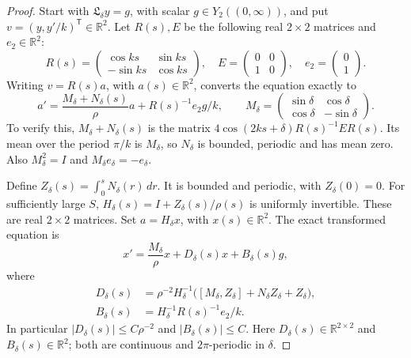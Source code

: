 \documentclass[11pt,a4paper]{article}
\newcommand{\R}{\mathbb R}
\begin{document}
\begin{proof}
Start with $\mathfrak L_\delta y=g$, with scalar
$g\in Y_2((0,\infty))$, and put $v=(y,y'/k)^{\mathsf T}\in\R^2$.
Let $R(s),E$ be the following real $2\times2$ matrices and $e_2\in\R^2$:
\[
 R(s)=\begin{pmatrix}\cos ks&\sin ks\\-\sin ks&\cos ks\end{pmatrix},
 \quad E=\begin{pmatrix}0&0\\1&0\end{pmatrix},
 \quad e_2=\begin{pmatrix}0\\1\end{pmatrix}.
\]
Writing $v=R(s)a$, with $a(s)\in\R^2$, converts the equation exactly to
\begin{equation}\label{eq:rotate}
 a'=\frac{M_\delta+N_\delta(s)}\rho a+R(s)^{-1}e_2g/k,\qquad
 M_\delta=\begin{pmatrix}\sin\delta&\cos\delta\\
                         \cos\delta&-\sin\delta\end{pmatrix}.
\end{equation}
To verify this, $M_\delta+N_\delta(s)$ is the matrix
$4\cos(2ks+\delta)R(s)^{-1}ER(s)$.
Its mean over the period $\pi/k$ is $M_\delta$, so $N_\delta$ is
bounded, periodic and has mean zero. Also $M_\delta^2=I$ and
$M_\delta e_\delta=-e_\delta$.

Define $Z_\delta(s)=\int_0^sN_\delta(r)\,dr$.
It is bounded and periodic, with $Z_\delta(0)=0$.
For sufficiently large $S$, $H_\delta(s)=I+Z_\delta(s)/\rho(s)$ is
uniformly invertible. These are real $2\times2$ matrices.
Set $a=H_\delta x$, with $x(s)\in\R^2$. The exact transformed equation is
\begin{equation}\label{eq:normal}
 x'=\frac{M_\delta}\rho x+D_\delta(s)x+B_\delta(s)g,
\end{equation}
where
\begin{align*}
 D_\delta(s)&=\rho^{-2}H_\delta^{-1}
 \bigl([M_\delta,Z_\delta]+N_\delta Z_\delta+Z_\delta\bigr),\\
 B_\delta(s)&=H_\delta^{-1}R(s)^{-1}e_2/k.
\end{align*}
In particular $|D_\delta(s)|\le C\rho^{-2}$ and $|B_\delta(s)|\le C$.
Here $D_\delta(s)\in\R^{2\times2}$ and $B_\delta(s)\in\R^2$;
both are continuous and $2\pi$-periodic in $\delta$.


\end{proof}
\end{document}
